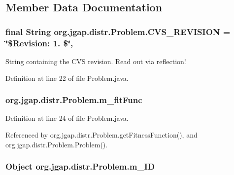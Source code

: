 \subsection{Member Data Documentation}
\hypertarget{classorg_1_1jgap_1_1distr_1_1_problem_acf18bb9b4eb9f0a74ab140c8c670258f}{
\subsubsection[{C\-V\-S\-\_\-\-R\-E\-V\-I\-S\-I\-O\-N}]{\setlength{\rightskip}{0pt plus 5cm}final String org.\-jgap.\-distr.\-Problem.\-C\-V\-S\-\_\-\-R\-E\-V\-I\-S\-I\-O\-N = \char`\"{}\$Revision\-: 1. \$\char`\"{}\hspace{0.3cm}{\ttfamily [static]}, {\ttfamily [private]}}}\label{classorg_1_1jgap_1_1distr_1_1_problem_acf18bb9b4eb9f0a74ab140c8c670258f}
String containing the C\-V\-S revision. Read out via reflection! 

Definition at line 22 of file Problem.\-java.

\hypertarget{classorg_1_1jgap_1_1distr_1_1_problem_a417cefe25d572240b3df893c3897cfe5}{
\subsubsection[{m\-\_\-fit\-Func}]{ org.\-jgap.\-distr.\-Problem.\-m\-\_\-fit\-Func\hspace{0.3cm}{\ttfamily [private]}}}\label{classorg_1_1jgap_1_1distr_1_1_problem_a417cefe25d572240b3df893c3897cfe5}


Definition at line 24 of file Problem.\-java.



Referenced by org.\-jgap.\-distr.\-Problem.\-get\-Fitness\-Function(), and org.\-jgap.\-distr.\-Problem.\-Problem().

\hypertarget{classorg_1_1jgap_1_1distr_1_1_problem_a46336e3315d66ec68420c1d4e7ee5371}{
\subsubsection[{m\-\_\-\-I\-D}]{\setlength{\rightskip}{0pt plus 5cm}Object org.\-jgap.\-distr.\-Problem.\-m\-\_\-\-I\-D\hspace{0.3cm}{\ttfamily [private]}}}\label{classorg_1_1jgap_1_1distr_1_1_problem_a46336e3315d66ec68420c1d4e7ee5371}


